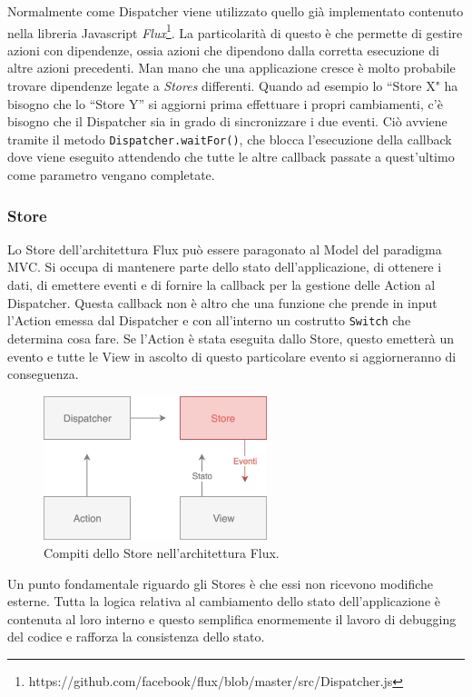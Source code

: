 \noindent
Normalmente come Dispatcher viene utilizzato quello già implementato contenuto nella libreria Javascript \textit{Flux}\footnote{https://github.com/facebook/flux/blob/master/src/Dispatcher.js}. La particolarità di questo è che permette di gestire azioni con dipendenze, ossia azioni che dipendono dalla corretta esecuzione di altre azioni precedenti. Man mano che una applicazione cresce è molto probabile trovare dipendenze legate a \textit{Stores} differenti. Quando ad esempio lo “Store X" ha bisogno che lo “Store Y” si aggiorni prima effettuare i propri cambiamenti, c'è bisogno che il Dispatcher sia in grado di sincronizzare i due eventi. Ciò avviene tramite il metodo \texttt{Dispatcher.waitFor()}, che blocca l'esecuzione della callback dove viene eseguito attendendo che tutte le altre callback passate a quest'ultimo come parametro vengano completate.

\subsubsection*{Store}
Lo Store dell'architettura Flux può essere paragonato al Model del paradigma MVC. Si occupa di mantenere parte dello stato dell'applicazione, di ottenere i dati, di emettere eventi e di fornire la callback per la gestione delle Action al Dispatcher. Questa callback non è altro che una funzione che prende in input l'Action emessa dal Dispatcher e con all'interno un costrutto \texttt{Switch} che determina cosa fare. Se l'Action è stata eseguita dallo Store, questo emetterà un evento e tutte le View in ascolto di questo particolare evento si aggiorneranno di conseguenza.

\begin{figure}[h]
\centering
\vspace*{0.5cm} 
\includegraphics[width=6.5cm]{./images/StoreWorkflow}
\caption{Compiti dello Store nell'architettura Flux.}
\label{StoreWorkflow}
\vspace*{0.5cm} 
\end{figure}

\noindent
Un punto fondamentale riguardo gli Stores è che essi non ricevono modifiche esterne. Tutta la logica relativa al cambiamento dello stato dell'applicazione è contenuta al loro interno e questo semplifica enormemente il lavoro di debugging del codice e rafforza la consistenza dello stato.

